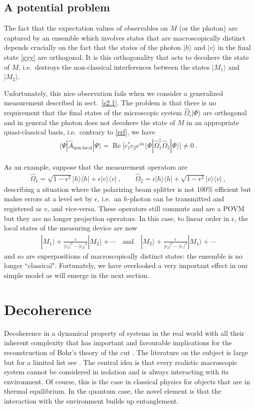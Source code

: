 \documentclass[12pt]{article}
\theoremstyle{plain}
\theoremstyle{definition}
\theoremstyle{remark}
\newcommand{\RE}{\operatorname{Re}}
\def\bra#1{\langle #1|}
\def\ket#1{| #1\rangle}
\newcommand{\EQ}[1]{\begin{equation}\begin{split} #1
\end{split}\end{equation}}
\begin{document}
\subsection{A potential problem}\label{s4.4}

The fact that the expectation values of observables on $M$ (or the photon) are captured by an ensemble which involves states that are macroscopically distinct depends crucially on the fact that the states of the photon $\ket{h}$ and $\ket{v}$ in the final state \eqref{gyy} are orthogonal. It is this orthogonality that acts to decohere the state of $M$, i.e.~destroys the non-classical interferences between the states $\ket{M_1}$ and $\ket{M_2}$. 

Unfortunately, this nice observation fails when we consider a generalized measurement described in sect.~\ref{s2.1}.
The problem is that there is no requirement that the final states of the microscopic system $\hat \Omega_i\ket{\Phi}$ are orthogonal and in general the photon does not decohere the state of $M$ in an appropriate quasi-classical basis, i.e.~contrary to \eqref{rrf}, we have
\EQ{
\bra{\Psi}\hat A_\text{non-local}\ket{\Psi}=\RE\Big[c_1^*c_2e^{i\alpha}\bra{\Phi}\hat\Omega^\dagger_1\hat\Omega_2\ket{\Phi}\Big]\neq0\ .
}

As an example, suppose that the measurement operators are
\EQ{
\hat\Omega_1=\sqrt{1-\epsilon^2}\ket{h}\bra{h}+\epsilon\ket{v}\bra{v}\ ,\qquad
\hat\Omega_2=\epsilon\ket{h}\bra{h}+\sqrt{1-\epsilon^2}\ket{v}\bra{v}\ ,
\label{rrw}
}
describing a situation where the polarizing beam splitter is not 100\% efficient but makes errors 
at a level set by $\epsilon$, i.e.~an $h$-photon can be transmitted and registered as $v$, and vice-versa. These operators still commute and are a POVM but they are no longer projection operators. In this case, to linear order in $\epsilon$, the local states of the measuring device are now
\EQ{
\ket{M_1}+\frac{\epsilon}{|c_1|^2-|c_2|^2}\ket{M_2} +\cdots\quad\text{and}\quad \ket{M_2}+\frac{\epsilon}{|c_2|^2-|c_1|^2}\ket{M_1}+\cdots
}
and so are superpositions of macroscopically distinct states: the ensemble is no longer ``classical". 
Fortunately, we have overlooked a very important effect in our simple model as will emerge in the next section.

\section{Decoherence}\label{s5}

Decoherence in a dynamical property of systems in the real world with all their inherent complexity that has important and favourable implications for the reconstruction of Bohr's theory of the cut \cite{SC1,SC2}. The literature on the subject is large but for a limited list see \cite{Zurek:1982ii,Caldeira:1982iu,Joos:1984uk,Unruh:1989dd,Zurek91,PHZ,ZHP,Zurek93,ZP,HSZ,Zurek98b,JZKGKS,Schlosshauer:2003zy}. The central idea is that every realistic macroscopic system cannot be considered in isolation and is always interacting with its environment. Of course, this is the case in classical physics for objects that are in thermal equilibrium. In the quantum case, the novel element is that the interaction with the environment builds up entanglement.
\end{document}
